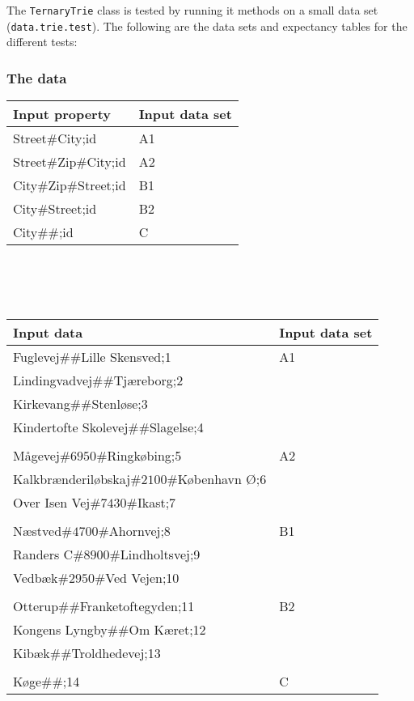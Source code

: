 The \texttt{TernaryTrie} class is tested by running it methods on a small data set (\texttt{data.trie.test}). The following are the data sets and expectancy tables for the different tests:

\subsubsection{The data}
\begin{tabular}{ p{8cm} | p{2cm} }
	\textbf{Input property} & \textbf{Input data set} \\	
	\hline
	Street$\#$City;id & A1 \\
	Street$\#$Zip$\#$City;id & A2 \\
	City$\#$Zip$\#$Street;id & B1 \\
	City$\#$Street;id &  B2 \\
	City$\#\#$;id & C \\
\end{tabular}
\\
\\
\\
\begin{tabular}{ p{8cm} | p{2cm} }
\textbf{Input data} & \textbf{Input data set} \\
	\hline
	Fuglevej$\#\#$Lille Skensved;1 & A1 \\
	Lindingvadvej$\#\#$Tj\ae reborg;2 \\
	Kirkevang$\#\#$Stenl\o se;3 \\
	Kindertofte Skolevej$\#\#$Slagelse;4 \\
	\\
	M\aa gevej$\#6950\#$Ringk\o bing;5 & A2 \\
	Kalkbr\ae nderil\o bskaj$\#2100\#$K\o benhavn \O ;6 \\
	Over Isen Vej$\#7430\#$Ikast;7 \\
	\\
	N\ae stved$\#4700\#$Ahornvej;8 & B1 \\
	Randers C$\#8900\#$Lindholtsvej;9 \\
	Vedb\ae k$\#2950\#$Ved Vejen;10 \\
	\\
	Otterup$\#\#$Franketoftegyden;11 & B2 \\
	Kongens Lyngby$\#\#$Om K\ae ret;12 \\
	Kib\ae k$\#\#$Troldhedevej;13 \\
	\\
	K\o ge$\#\#$;14 & C \\
\end{tabular}


